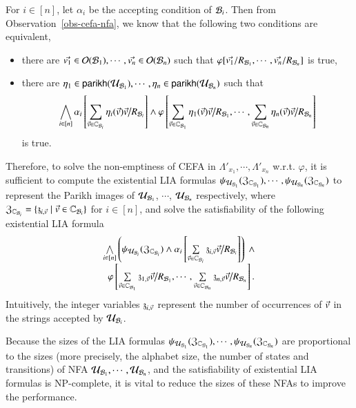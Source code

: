 For $i \in [n]$, let $\alpha_i$ be the accepting condition of $\mathcal{B}_i$. 
Then from Observation~\ref{obs-cefa-nfa}, we know that the following two conditions are equivalent, 
\begin{itemize}

\item there are $\vec{v_{1}} \in \mathcal{O}(\mathcal{B}_1), \cdots, \vec{v_{n}} \in \mathcal{O}(\mathcal{B}_n)$ such that $\varphi[\vec{v_{1}}/R_{\mathcal{B}_{1}}, \cdots, \vec{v_{n}}/R_{\mathcal{B}_{n}}]$ is true, 
\item 
there are $\eta_1 \in \mathsf{parikh}(\mathcal{U}_{\mathcal{B}_1}), \cdots, \eta_n \in \mathsf{parikh}(\mathcal{U}_{\mathcal{B}_n})$ such that 
\[
\bigwedge \limits_{i \in [n]} \alpha_i\left[ \sum \limits_{\vec{v} \in \mathbb{C}_{\mathcal{B}_i}} \eta_i(\vec{v}) \vec{v} \big{/}R_{\mathcal{B}_i}  \right] \wedge \varphi \left[\sum \limits_{\vec{v} \in \mathbb{C}_{\mathcal{B}_1}} \eta_1(\vec{v}) \vec{v} \big{/}R_{\mathcal{B}_1}, \cdots, \sum \limits_{\vec{v} \in \mathbb{C}_{\mathcal{B}_n}} \eta_n(\vec{v}) \vec{v} \big{/}R_{\mathcal{B}_n} \right]
\]
is true. 
\end{itemize}

Therefore, to solve the non-emptiness of CEFA in $\Lambda'_{x_1}, \cdots, \Lambda'_{x_n}$ w.r.t. $\varphi$, it is sufficient to compute the existential LIA formulas $\psi_{\mathcal{U}_{\mathcal{B}_1}}(\mathfrak{Z}_{\mathbb{C}_{\mathcal{B}_1}}), \cdots, \psi_{\mathcal{U}_{\mathcal{B}_n}}(\mathfrak{Z}_{\mathbb{C}_{\mathcal{B}_n}})$ to represent the Parikh images of $\mathcal{U}_{\mathcal{B}_1}$, $\cdots$, $\mathcal{U}_{\mathcal{B}_n}$ respectively, where $\mathfrak{Z}_{\mathbb{C}_{\mathcal{B}_i}} = \{\mathfrak{z}_{i,\vec{v}} \mid \vec{v} \in \mathbb{C}_{\mathcal{B}_i}\}$ for $i \in [n]$, and solve the satisfiability of the following existential LIA formula
\[
\begin{array}{l}
\bigwedge \limits_{i \in [n]} \left(\psi_{\mathcal{U}_{\mathcal{B}_i}}(\mathfrak{Z}_{\mathbb{C}_{\mathcal{B}_i}}) \wedge \alpha_i\left[\sum\limits_{\vec{v} \in \mathbb{C}_{\mathcal{B}_i}} \mathfrak{z}_{i, \vec{v}} \vec{v} \big{/}R_{\mathcal{B}_i}  \right] \right)\  \wedge \\
\ \ \varphi \left[ \sum\limits_{\vec{v} \in \mathbb{C}_{\mathcal{B}_1}} \mathfrak{z}_{1, \vec{v}} \vec{v} \big{/}R_{\mathcal{B}_1}, \cdots, \sum\limits_{\vec{v} \in \mathbb{C}_{\mathcal{B}_n}} \mathfrak{z}_{n, \vec{v}} \vec{v} \big{/}R_{\mathcal{B}_n} \right].
\end{array}
\]
Intuitively, the integer variables $\mathfrak{z}_{i, \vec{v}}$ represent the number of occurrences of $\vec{v}$ in the strings accepted by $\mathcal{U}_{\mathcal{B}_i}$.

Because the sizes of the LIA formulas $\psi_{\mathcal{U}_{\mathcal{B}_1}}(\mathfrak{Z}_{\mathbb{C}_{\mathcal{B}_1}}), \cdots, \psi_{\mathcal{U}_{\mathcal{B}_n}}(\mathfrak{Z}_{\mathbb{C}_{\mathcal{B}_n}})$ are proportional to the sizes (more precisely, the alphabet size, the number of states and transitions) of NFA $\mathcal{U}_{\mathcal{B}_1}, \cdots, \mathcal{U}_{\mathcal{B}_n}$, and the satisfiability of existential LIA formulas is NP-complete, it is vital to reduce the sizes of these NFAs to improve the performance.

